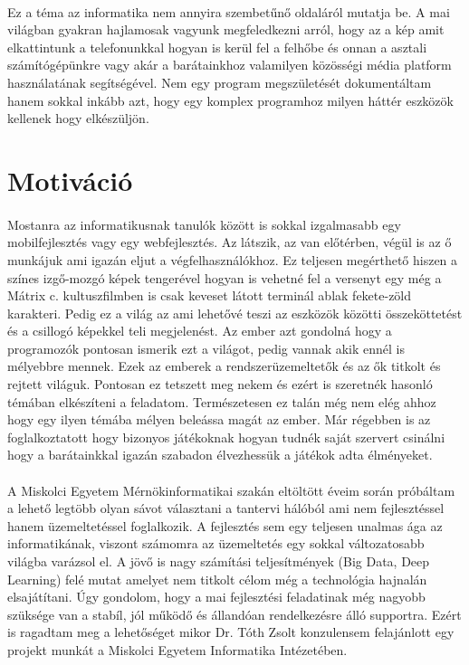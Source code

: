 \paragraph{}
Ez a téma az informatika nem annyira szembetűnő oldaláról mutatja be. 
A mai világban gyakran hajlamosak vagyunk megfeledkezni arról, hogy az a kép amit elkattintunk a telefonunkkal hogyan is kerül fel a felhőbe és onnan a asztali számítógépünkre vagy akár a barátainkhoz valamilyen közösségi média platform használatának segítségével.
Nem egy program megszületését dokumentáltam hanem sokkal inkább azt, hogy egy komplex programhoz milyen háttér eszközök kellenek hogy elkészüljön.
\pagebreak
\section{Motiváció}
\label{chapMotivation}

\paragraph{}
Mostanra az informatikusnak tanulók között is sokkal izgalmasabb egy mobilfejlesztés vagy egy webfejlesztés.
Az látszik, az van előtérben, végül is az ő munkájuk ami igazán eljut a végfelhasználókhoz.
Ez teljesen megérthető hiszen a színes izgő-mozgó képek tengerével hogyan is vehetné fel a versenyt egy még a Mátrix c. kultuszfilmben is csak keveset látott terminál ablak fekete-zöld karakteri.
Pedig ez a világ az ami lehetővé teszi az eszközök közötti összeköttetést és a csillogó képekkel teli megjelenést.
Az ember azt gondolná hogy a programozók pontosan ismerik ezt a világot, pedig vannak akik ennél is mélyebbre mennek.
Ezek az emberek a rendszerüzemeltetők és az ők titkolt és rejtett világuk.
Pontosan ez tetszett meg nekem és ezért is szeretnék hasonló témában elkészíteni a feladatom.
Természetesen ez talán még nem elég ahhoz hogy egy ilyen témába mélyen beleássa  magát az ember.
Már régebben is az foglalkoztatott hogy bizonyos játékoknak hogyan tudnék saját szervert csinálni hogy a barátainkkal igazán szabadon élvezhessük a játékok adta élményeket.

\paragraph{}
A Miskolci Egyetem Mérnökinformatikai szakán eltöltött éveim során próbáltam a lehető legtöbb olyan sávot választani a tantervi hálóból ami nem fejlesztéssel hanem üzemeltetéssel foglalkozik. 
A fejlesztés sem egy teljesen unalmas ága az informatikának, viszont számomra az üzemeltetés egy sokkal változatosabb világba varázsol el.
A jövő is nagy számítási teljesítmények (Big Data, Deep Learning) felé mutat amelyet nem titkolt célom még a technológia hajnalán elsajátítani. 
Úgy gondolom, hogy a mai fejlesztési feladatinak még nagyobb szüksége van a stabíl, jól működő és állandóan rendelkezésre álló supportra. 
Ezért is ragadtam meg a lehetőséget mikor Dr. Tóth Zsolt konzulensem felajánlott egy projekt munkát a Miskolci Egyetem Informatika Intézetében. 

